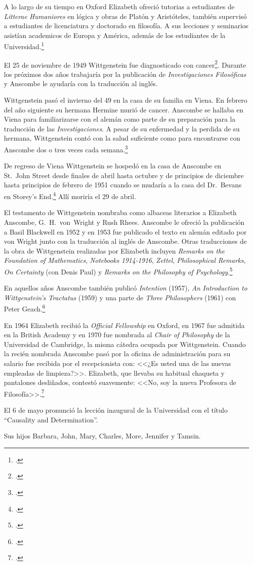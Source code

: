 A lo largo de su tiempo en Oxford Elizabeth ofreció tutorias a estudiantes de
\emph{Litterae Humaniores} en lógica y obras de Platón y Aristóteles, también
supervisó a estudiantes de licenciatura y doctorado en filosofía. A sus
lecciones y seminarios asistían academicos de Europa y América, además de los
estudiantes de la Universidad.\footcite[cfr.~][p.~32]{biofellows}

El 25 de noviembre de 1949 Wittgenstein fue diagnosticado con
cancer\footcite[cf.~][loc 11034]{monk}. Durante los próximos dos años trabajaría
por la publicación de \emph{Investigaciones Filosóficas} y Anscombe le ayudaría
con la traducción al inglés. 

Wittgenstein pasó el invierno del 49 en la casa de su familia en Viena. En
febrero del año siguiente su hermana Hermine murió de cancer. Anscombe se
hallaba en Viena para familiarizarse con el alemán como parte de su preparación
para la traducción de las \emph{Investigaciones}. A pesar de su enfermedad y la
perdida de su hermana, Wittgenstein contó con la salud suficiente como para
encontrarse con Anscombe dos o tres veces cada semana.\footcite[cf.~][loc
11138]{monk}

De regreso de Viena Wittgenstein se hospedó en la casa de Anscombe en St.~John
Street desde finales de abril hasta octubre y de principios de diciembre hasta
principios de febrero de 1951 cuando se mudaría a la casa del Dr.~Bevans en
Storey's End.\footcite[cf.~][loc. 11242]{monk} Allí moriría el 29 de abril.

El testamento de Wittgenstein nombraba como albaceas literarios a Elizabeth
Anscombe, G.~H.~von~Wright y Rush Rhees. Anscombe le ofreció la publicación a
Basil Blackwell en 1952 y en 1953 fue publicado el texto en alemán editado por
von Wright junto con la traducción al inglés de Anscombe. Otras traducciones de
la obra de Wittgenstein realizadas por Elizabeth incluyen \emph{Remarks on the
  Foundation of Mathematics}, \emph{Notebooks 1914-1916}, \emph{Zettel},
\emph{Philosophical Remarks}, \emph{On Certainty} (con Denis Paul) y
\emph{Remarks on the Philosophy of
  Psychology}.\footcite[cfr.~][p.~38]{biofellows}


En aquellos años Anscombe también publicó \emph{Intention} (1957), \emph{An
  Introduction to Wittgenstein's Tractatus} (1959) y una parte de \emph{Three
  Philosophers} (1961) con Peter Geach.\footcite[cfr.~][p.~39]{biofellows}

En 1964 Elizabeth recibió la \emph{Official Fellowship} en Oxford, en 1967 fue
admitida en la British Academy y en 1970 fue nombrada al \emph{Chair of
  Philosophy} de la Universidad de Cambridge, la misma cátedra ocupada por
Wittgenstein. Cuando la recién nombrada Anscombe pasó por la oficina de
administración para su salario fue recibida por el recepcionista con: <<¿Es usted
una de las nuevas empleadas de limpieza?>>. Elizabeth, que llevaba su habitual
chaqueta y pantalones desliñados, contestó suavemente: <<No, soy la nueva
Profesora de Filosofía>>.\footcite[cfr.~][p.~37]{biofellows}

El 6 de mayo pronunció la lección inaugural de la Universidad con el título
``Causality and Determination''.

Sus hijos Barbara, John, Mary, Charles, More, Jennifer y Tamsin.
